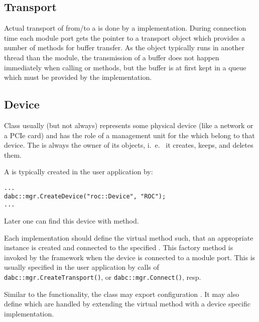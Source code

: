 \subsection{Transport}

Actual transport of  from/to a  is done by a  implementation.
During connection time each module port gets the pointer to a transport object
which provides a number of methods for buffer transfer. 
As the  object typically runs in another thread than the module,
the transmission of a buffer does not happen immediately when calling 
 or  methods, but
the buffer is at first kept in a queue which must be provided by the
 implementation.

 

\subsection{Device}
\label{prog_plugin_device_device}
Class  usually (but not always) represents some physical
device (like a network or a PCIe card) and has the role of a management unit for 
the  which belong to that device. 
The  is always the owner of its  objects, i.~e.~
it creates, keeps, and deletes them.

A  is typically created in the user application by:
\begin{small}
\begin{verbatim}
...
dabc::mgr.CreateDevice("roc::Device", "ROC");
...
\end{verbatim}     
\end{small}

Later one can find this device with  method.

Each  implementation should define the virtual method  such, that an appropriate  instance 
is created and connected to the specified .
This factory method is invoked by the framework when the device is connected to 
a module port. This is usually specified in the user application by calls
of\\ 
{\tt dabc::mgr.CreateTransport()}, or {\tt dabc::mgr.Connect()},
resp.  

Similar to the  functionality, the  class
may export configuration . It may also 
define  which are handled by extending the
virtual method  with a device specific
implementation.      
      

